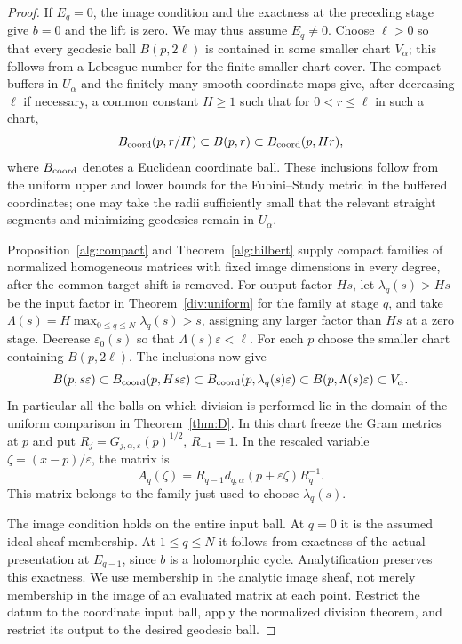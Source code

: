 \documentclass[11pt,reqno]{amsart}
\numberwithin{equation}{section}
\theoremstyle{definition}
\theoremstyle{remark}
\begin{document}
\begin{proof}
If $E_q=0$, the image condition and the exactness at the preceding
stage give $b=0$ and the lift is zero. We may thus assume $E_q\ne0$.
Choose $\ell>0$ so that every geodesic ball $B(p,2\ell)$ is
contained in some smaller chart $V_\alpha$; this follows from a
Lebesgue number for the finite smaller-chart cover. The compact
buffers in $U_\alpha$ and the finitely many smooth coordinate maps
give, after decreasing $\ell$ if necessary, a common constant
$H\geq1$ such that for $0<r\leq\ell$ in such a chart,
\[
 B_{\rm coord}(p,r/H)\subset B(p,r)\subset B_{\rm coord}(p,Hr),
\]
where $B_{\rm coord}$ denotes a Euclidean coordinate ball. These
inclusions follow from the uniform upper and lower bounds for the
Fubini--Study metric in the buffered coordinates; one may take the
radii sufficiently small that the relevant straight segments and
minimizing geodesics remain in $U_\alpha$.

Proposition~\ref{alg:compact} and Theorem~\ref{alg:hilbert} supply
compact families of normalized homogeneous matrices with fixed image
dimensions in every degree, after the common target shift is removed.
For output factor $Hs$, let $\lambda_q(s)>Hs$ be the input factor in
Theorem~\ref{div:uniform} for the family at stage $q$, and take
$\Lambda(s)=H\max_{0\leq q\leq N}\lambda_q(s)>s$, assigning any larger
factor than $Hs$ at a zero stage. Decrease $\varepsilon_0(s)$ so
that $\Lambda(s)\varepsilon<\ell$. For each $p$ choose the smaller
chart containing $B(p,2\ell)$. The inclusions now give
\[
 B(p,s\varepsilon)\subset B_{\rm coord}(p,Hs\varepsilon)
 \subset B_{\rm coord}(p,\lambda_q(s)\varepsilon)
 \subset B(p,\Lambda(s)\varepsilon)\subset V_\alpha.
\]
In particular all the balls on which division is performed lie in the
domain of the uniform comparison in Theorem~\ref{thm:D}. In this
chart freeze the Gram metrics at $p$ and put
$R_j=G_{j,\alpha,\varepsilon}(p)^{1/2}$, $R_{-1}=1$.
In the rescaled variable $\zeta=(x-p)/\varepsilon$, the matrix is
\[
 A_q(\zeta)=R_{q-1}d_{q,\alpha}(p+\varepsilon\zeta)R_q^{-1}.
\]
This matrix belongs to the family just used to choose $\lambda_q(s)$.

The image condition holds on the entire input ball. At $q=0$ it is
the assumed ideal-sheaf membership. At $1\leq q\leq N$ it follows
from exactness of the actual presentation at $E_{q-1}$, since $b$
is a holomorphic cycle. Analytification preserves this exactness.
We use membership in the analytic image sheaf, not merely membership
in the image of an evaluated matrix at each point. Restrict the datum
to the coordinate input ball, apply the normalized division theorem,
and restrict its output to the desired geodesic ball.


\end{proof}
\end{document}
